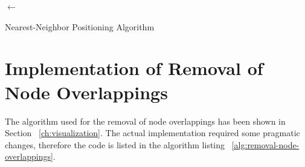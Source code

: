 \begin{algorithm}[ht]

\MinStress$\leftarrow$ \Min{\UpperRightStress, \LowerRightStress, \UpperLeftStress, \LowerLeftStress}\;

\If{\UpperRightStress $==$ \MinStress}{\SetPosition{\Subject, \UpperRightQuadrant}\;}
\ElseIf{\LowerRightStress $==$ \MinStress}{\SetPosition{\Subject, \LowerRightQuadrant}\;}
\ElseIf{\UpperLeftStress $==$ \MinStress}{\SetPosition{\Subject, \UpperLeftQuadrant}\;}
\Else{\SetPosition{\Subject, \LowerLeftQuadrant}\;}


\BlankLine
\caption{Nearest-Neighbor Positioning Algorithm}
\label{alg:nearest-neighbor-positioning}
\end{algorithm}

\section{Implementation of Removal of Node Overlappings}
\label{subch:implementation-overlapping}

The algorithm used for the removal of node overlappings has been shown in Section ~\ref{ch:visualization}. The actual implementation required some pragmatic changes, therefore the code is listed in the algorithm listing ~\ref{alg:removal-node-overlappings}.

